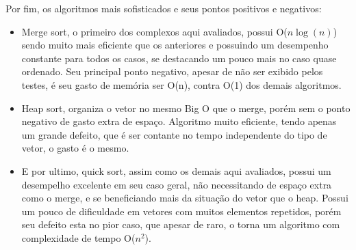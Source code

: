 Por fim, os algoritmos mais sofisticados e seus pontos positivos e negativos:
\begin{itemize}
   \item Merge sort, o primeiro dos complexos aqui avaliados, possui O($n\log(n)$) sendo muito mais eficiente que os anteriores e possuindo um desempenho constante para todos os casos, se destacando um pouco mais no caso quase ordenado. Seu principal ponto negativo, apesar de não ser exibido pelos testes, é seu gasto de memória ser O(n), contra O(1) dos demais algoritmos.
   
   \item Heap sort, organiza o vetor no mesmo Big O que o merge, porém sem o ponto negativo de gasto extra de espaço. Algoritmo muito eficiente, tendo apenas um grande defeito, que é ser contante no tempo independente do tipo de vetor, o gasto é o mesmo.
   
   \item E por ultimo, quick sort, assim como os demais aqui avaliados, possui um desempelho excelente em seu caso geral, não necessitando de espaço extra como o merge, e se beneficiando mais da situação do vetor que o heap. Possui um pouco de dificuldade em vetores com muitos elementos repetidos, porém seu defeito esta no pior caso, que apesar de raro, o torna um algoritmo com complexidade de tempo O($n^2$).
 \end{itemize}